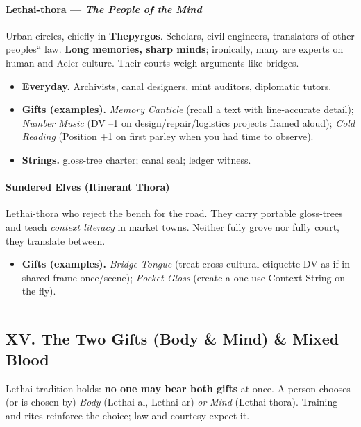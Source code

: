 \documentclass[11pt]{article}
\begin{document}
\paragraph{Lethai-thora --- \emph{The People of the Mind}} 
Urban circles, chiefly in \textbf{Thepyrgos}. Scholars, civil engineers, translators of other peoples`` law. \textbf{Long memories, sharp minds}; ironically, many are experts on human and Aeler culture. Their courts weigh arguments like bridges.

\begin{itemize}[leftmargin=*]
  \item \textbf{Everyday.} Archivists, canal designers, mint auditors, diplomatic tutors.
  \item \textbf{Gifts (examples).} \emph{Memory Canticle} (recall a text with line-accurate detail); \emph{Number Music} (DV --1 on design/repair/logistics projects framed aloud); \emph{Cold Reading} (Position +1 on first parley when you had time to observe).
  \item \textbf{Strings.} gloss-tree charter; canal seal; ledger witness.
\end{itemize}

\paragraph{Sundered Elves (Itinerant Thora)} 
Lethai-thora who reject the bench for the road. They carry portable gloss-trees and teach \emph{context literacy} in market towns. Neither fully grove nor fully court, they translate between.

\begin{itemize}[leftmargin=*]
  \item \textbf{Gifts (examples).} \emph{Bridge-Tongue} (treat cross-cultural etiquette DV as if in shared frame once/scene); \emph{Pocket Gloss} (create a one-use Context String on the fly).
\end{itemize}

\medskip\hrule\medskip

\subsection{XV. The Two Gifts (Body \& Mind) \& Mixed Blood}

Lethai tradition holds: \textbf{no one may bear both gifts} at once. A person chooses (or is chosen by) \emph{Body} (Lethai-al, Lethai-ar) \emph{or} \emph{Mind} (Lethai-thora). Training and rites reinforce the choice; law and courtesy expect it.
\end{document}

